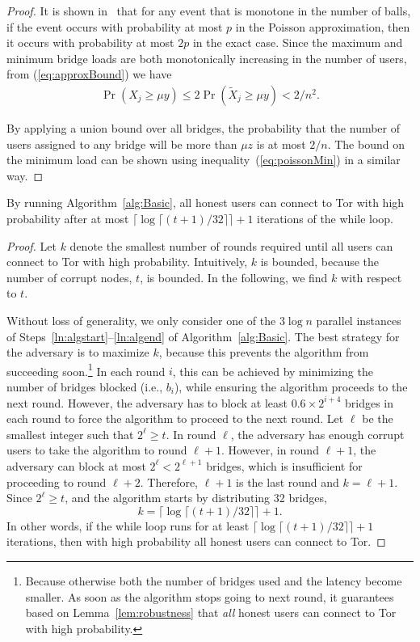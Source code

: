\documentclass[a4paper,UKenglish]{lipics-v2016}
\newcommand{\ie}{i.e.}
\newcommand{\sfsize}{\fontsize{0.68\baselineskip}{0.68\baselineskip}\selectfont}
\newcommand{\sans}[1]{\textbf{\textsf{\sfsize \mbox{#1}}}}
\begin{document}
\begin{proof}
	It is shown in~\cite[Corollary 5.11]{Michael2005} that for any event that is monotone in the number of balls, if the event occurs with probability at most $p$ in the Poisson approximation, then it occurs with probability at most $2p$ in the exact case. Since the maximum and minimum bridge loads are both monotonically increasing in the number of users, from (\ref{eq:approxBound}) we have
	\begin{align*}
	\Pr(X_j \geq \mu y) \leq 2\Pr(\tilde{X}_j \geq \mu y) < 2/n^2.
	\end{align*}
	
	By applying a union bound over all bridges, the probability that the number of users assigned to any bridge will be more than $\mu z$ is at most $2/n$. The bound on the minimum load can be shown using inequality~(\ref{eq:poissonMin}) in a similar way.
\end{proof}

\begin{lemma}[\sans{Latency}] \label{lem:NumIterationsBasic}
	By running Algorithm~\ref{alg:Basic}, all honest users can connect to Tor with high probability after at most ${\lceil \log{\lceil (t+1)/32 \rceil} \rceil + 1}$ iterations of the while loop.
\end{lemma}
\begin{proof}
	Let $k$ denote the smallest number of rounds required until all users can connect to Tor with high probability. Intuitively, $k$ is  bounded, because the number of corrupt nodes, $t$, is bounded. In the following, we find $k$ with respect to $t$. 
	
	Without loss of generality, we only consider one of the $3\log{n}$ parallel instances of Steps~\ref{ln:algstart}--\ref{ln:algend} of Algorithm~\ref{alg:Basic}. The best strategy for the adversary is to maximize $k$, because this prevents the algorithm from succeeding soon.\footnote{Because otherwise both the number of bridges used and the latency become smaller. As soon as the algorithm stops going to next round, it guarantees based on Lemma~\ref{lem:robustness} that \emph{all} honest users can connect to Tor with high probability.} In each round $i$, this can be achieved by minimizing the number of bridges blocked (\ie, $b_i$), while ensuring the algorithm proceeds to the next round. However, the adversary has to block at least ${0.6 \times 2^{i+4}}$ bridges in each round to force the algorithm to proceed to the next round. Let $\ell$ be the smallest integer such that ${2^\ell \geq t}$. In round $\ell$, the adversary has enough corrupt users to take the algorithm to round ${\ell + 1}$. However, in round ${{\ell + 1}}$, the adversary can block at most ${2^\ell < 2^{\ell+1}}$ bridges, which is insufficient for proceeding to round ${\ell + 2}$. Therefore, ${\ell + 1}$ is the last round and ${k = \ell + 1}$. Since ${2^\ell \geq t}$, and the algorithm starts by distributing 32 bridges, 
	\[k = \lceil \log{\lceil (t+1)/32 \rceil} \rceil + 1.\] 
	In other words, if the while loop runs for at least ${\lceil \log{\lceil (t+1)/32 \rceil} \rceil + 1}$ iterations, then with high probability all honest users can connect to Tor.
\end{proof}
\end{document}
